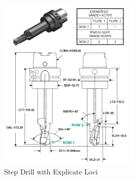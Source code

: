 \begin{figure}[ht]
  \centering
  \includegraphics[width=0.6\textwidth]{figures/a11-step-drill-with-explicate-loci.png}
  \caption{Step Drill with Explicate Loci}
  \label{fig:a11-step-drill-with-explicate-loci}
\end{figure}
\FloatBarrier


